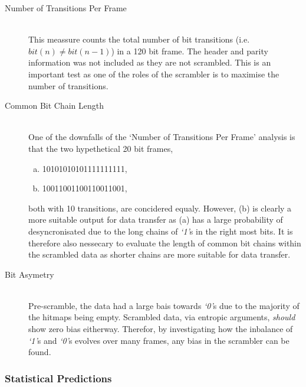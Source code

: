 			\begin{description}
				\item[Number of Transitions Per Frame] \hfill \\
					This meassure counts the total number of bit transitions (i.e. $bit(n) \neq bit(n-1)$) in a 120 bit frame. 
					The header and parity information was not included as they are not scrambled.
					This is an important test as one of the roles of the scrambler is to maximise the number of transitions.

				\item[Common Bit Chain Length] \hfill \\
					One of the downfalls of the `Number of Transitions Per Frame' analysis is that the two hypethetical 20 bit frames,

					\begin{enumerate}[a)]
						\item \textsc{10101010101111111111},
						\item \textsc{10011001100110011001},
					\end{enumerate}

					both with 10 transitions, are concidered equaly. However, (b) is clearly a more suitable output for data transfer as (a) has a large probability of desyncronisated due to the long chains of \textit{`1'}s in the right most bits.
					It is therefore also nessecary to evaluate the length of common bit chains within the scrambled data as shorter chains are more suitable for data transfer.

				\item[Bit Asymetry] \hfill \\
					Pre-scramble, the data had a large bais towards \textit{`0'}s due to the majority of the hitmaps being empty.
					Scrambled data, via entropic arguments, \textit{should} show zero bias eitherway.
					Therefor, by investigating how the inbalance of \textit{`1'}s and \textit{`0'}s evolves over many frames, any bias in the scrambler can be found.

			\end{description}	

		\subsubsection{Statistical Predictions} %
		\label{subsub:statistical_predictions}

